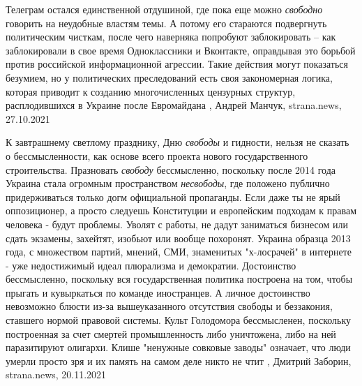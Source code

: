 Телеграм остался единственной отдушиной, где пока еще можно \emph{свободно}
говорить на неудобные властям темы. А потому его стараются подвергнуть
политическим чисткам, после чего наверняка попробуют заблокировать – как
заблокировали в свое время Одноклассники и Вконтакте, оправдывая это борьбой
против российской информационной агрессии.  Такие действия могут показаться
безумием, но у политических преследований есть своя закономерная логика,
которая приводит к созданию многочисленных цензурных структур, расплодившихся в
Украине после Евромайдана
, 
Андрей Манчук, strana.news, 27.10.2021

К завтрашнему светлому празднику, Дню \emph{свободы} и гидности, нельзя не сказать о
бессмысленности, как основе всего проекта нового государственного
строительства.  Празновать \emph{свободу} бессмысленно, поскольку после 2014
года Украина стала огромным пространством \emph{несвободы}, где положено публично
придерживаться только догм официальной пропаганды. Если даже ты не ярый
оппозиционер, а просто следуешь Конституции и европейским подходам к правам
человека - будут проблемы.  Уволят с работы, не дадут заниматься бизнесом или
сдать экзамены, захейтят, изобьют или вообще похоронят. Украина образца 2013
года, с множеством партий, мнений, СМИ, знаменитых "х-лосрачей" в интернете -
уже недостижимый идеал плюрализма и демократии.  Достоинство бессмысленно,
поскольку вся государственная политика построена на том, чтобы прыгать и
кувыркаться по команде иностранцев. А личное достоинство невозможно блюсти
из-за вышеуказанного отсутствия свободы и беззакония, ставшего нормой правовой
системы.  Культ Голодомора бессмысленен, поскольку построенная за счет смертей
промышленность либо уничтожена, либо на ней паразитируют олигархи. Клише
"ненужные совковые заводы" означает, что люди умерли просто зря и их память на
самом деле никто не чтит
, 
Дмитрий Заборин, strana.news, 20.11.2021
